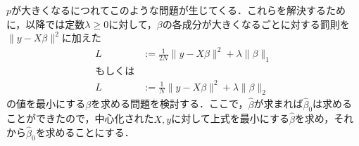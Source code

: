 \documentclass{jsarticle}
\theoremstyle{definition}
\begin{document}
$p$が大きくなるにつれてこのような問題が生じてくる．これらを解決するために，以降では定数$\lambda\geq0$に対して，$\beta$の各成分が大きくなるごとに対する罰則を$\|y-X\beta\|^2$に加えた
\begin{align*}
L&:=\frac{1}{2N}\|y-X\beta\|^2+\lambda\|\beta\|_1\\
もしくは&\\
L&:=\frac{1}{N}\|y-X\beta\|^2+\lambda\|\beta\|_2
\end{align*}
の値を最小にする$\beta$を求める問題を検討する．ここで，$\hat{\beta}$が求まれば$\hat{\beta}_0$は求めることができたので，中心化された$X,y$に対して上式を最小にする$\hat{\beta}$を求め，それから$\hat{\beta}_0$を求めることにする．
\end{document}
